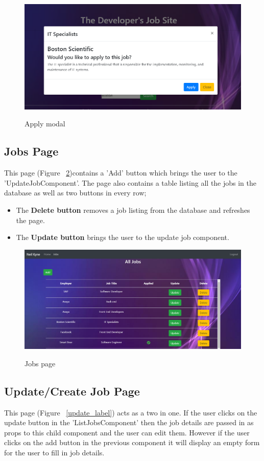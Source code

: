 \begin{figure}[ht]
    \centering
    \includegraphics[scale=0.4]{Images/apply.png} 
    \label{apply_label}
    \caption{Apply modal}
\end{figure}

\subsection{Jobs Page}
This page (Figure ~\ref{jobs_label})contains a 'Add' button which brings the user to the 'UpdateJobComponent'. The page also contains a table listing all the jobs in the database as well as two buttons in every row;

\begin{itemize}
    \item The \textbf{Delete button} removes a job listing from the database and refreshes the page.
    \item The \textbf{Update button} brings the user to the update job component.
\end{itemize}
\begin{figure}[ht]
    \centering
    \includegraphics[scale=0.3]{Images/jobs.png} 
    \label{jobs_label}
    \caption{Jobs page}
\end{figure}

\subsection{Update/Create Job Page}
This page (Figure ~\ref{update_label}) acts as a two in one. If the user clicks on the update button in the 'ListJobsComponent' then the job details are passed in as props to this child component and the user can edit them. However if the user clicks on the add button in the previous component it will display an empty form for the user to fill in job details.

